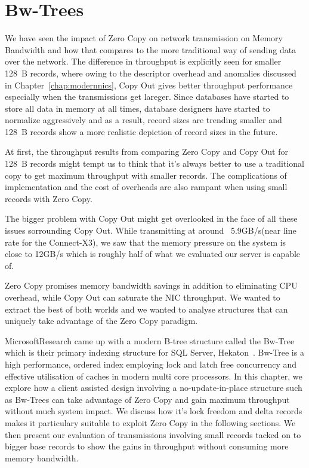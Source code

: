 
\chapter{Bw-Trees}
\label{chap:bw-tree}

We have seen the impact of Zero Copy on network transmission on Memory Bandwidth and how that 
compares to the more traditional way of sending data over the network. The difference
in throughput is explicitly seen for smaller 128~B records, where owing to the descriptor overhead and anomalies discussed 
in Chapter~\ref{chap:modernnics}, Copy Out gives better throughput performance especially when the transmissions get lareger.
Since databases have started to store all data in memory at all times, database designers have started to normalize 
aggressively and as a result, record sizes are trending smaller and 128~B records show
a more realistic depiction of record sizes in the future. 

At first, the throughput results from comparing Zero Copy and Copy Out for 128~B 
records might tempt us to think that it's always better to use a traditional copy to get maximum throughput with smaller records.
The complications of implementation and the cost of overheads are also rampant when using small records with Zero Copy.

The bigger problem with Copy Out might get overlooked in the face of all these issues sorrounding Copy Out.
While transmitting at around ~5.9GB/s(near line rate for the Connect-X3\textregistered),
we saw that the memory pressure on the system is close to 12GB/s which is roughly half of what we evaluated our server is capable of.

Zero Copy promises memory bandwidth savings in addition to eliminating CPU overhead, 
while Copy Out can saturate the NIC throughput. We wanted to extract the best of both worlds 
and we wanted to analyse structures that can uniquely take advantage of the 
Zero Copy paradigm. 

Microsoft\textregistered Research came up with a modern B-tree structure called 
the Bw-Tree~\cite{bw-tree} which is their primary indexing structure for SQL Server, Hekaton~\cite{hekaton}.
Bw-Tree is a high performance, ordered index employing lock and latch free concurrency and effective utilisation of caches in 
modern multi core processors. In this chapter, we explore how a client assisted design involving a no-update-in-place 
structure such as Bw-Trees can take advantage of Zero Copy and gain maximum throughput 
without much system impact. We discuss how it's lock freedom and delta records makes it 
particulary suitable to exploit Zero Copy in the following sections. We then present
our evaluation of transmissions involving small records tacked on to bigger base records
to show the gains in throughput without consuming more memory bandwidth. 

